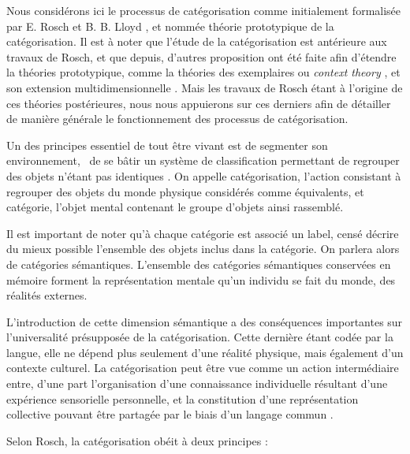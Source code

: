 Nous considérons ici le processus de catégorisation comme initialement formalisée par E. Rosch et B. B. Lloyd \citep{rosch1978cognition}, et nommée théorie prototypique de la catégorisation. Il est à noter que l'étude de la catégorisation est antérieure aux travaux de Rosch, et que depuis, d'autres proposition ont été faite afin d'étendre la théories prototypique, comme la théories des exemplaires ou \textit{context theory} \citep{medin1978context}, et son extension multidimensionnelle \citep{medin1978context}. Mais les travaux de Rosch étant à l'origine de ces théories postérieures, nous nous appuierons sur ces derniers afin de détailler de manière générale le fonctionnement des processus de catégorisation. 

Un des principes essentiel de tout être vivant est de segmenter son environnement, \ie~de se bâtir un système de classification permettant de regrouper des objets n'étant pas identiques \citep[p. 1]{rosch1978cognition}. On appelle catégorisation, l'action consistant à regrouper des objets du monde physique considérés comme équivalents, et catégorie, l'objet mental contenant le groupe d'objets ainsi rassemblé. 

Il est important de noter qu'à chaque catégorie est associé un label, censé décrire du mieux possible l'ensemble des objets inclus dans la catégorie. On parlera alors de catégories sémantiques. L'ensemble des catégories sémantiques conservées en mémoire forment la représentation mentale qu'un individu se fait du monde, des réalités externes. 

L'introduction de cette dimension sémantique a des conséquences importantes sur l'universalité présupposée de la catégorisation. Cette dernière étant codée par la langue, elle ne dépend plus seulement d'une réalité physique, mais également d'un contexte culturel. La catégorisation peut être vue comme un action intermédiaire entre, d'une part l'organisation d'une connaissance individuelle résultant d'une expérience sensorielle personnelle, et la constitution d'une représentation collective pouvant être partagée par le biais d'un langage commun \citep{dubois2006cognitive}. 

Selon Rosch, la catégorisation obéit à deux principes \citep[p. 29]{rosch1978cognition}:

